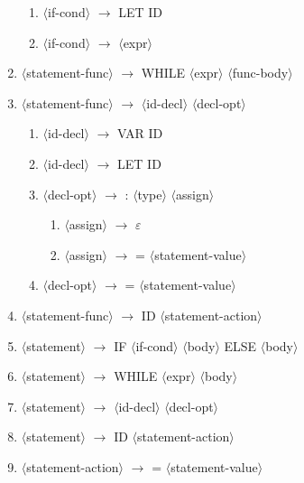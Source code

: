 \documentclass[11pt]{article}
\newcommand{\red}[1]{{\color{red} #1}}
\begin{document}
\begin{enumerate}[label=\arabic*., ref=\arabic*]
\begin{enumerate}[label=\arabic{enumi}.\arabic*., ref=\arabic{enumi}.\arabic*]
        \item $\langle$if-cond$\rangle$ $\rightarrow$ \red{LET ID}
        \item $\langle$if-cond$\rangle$ $\rightarrow$ $\langle$expr$\rangle$
    \end{enumerate}
    \item $\langle$statement-func$\rangle$ $\rightarrow$ \red{WHILE} $\langle$expr$\rangle$ $\langle$func-body$\rangle$
    \item $\langle$statement-func$\rangle$ $\rightarrow$ $\langle$id-decl$\rangle$ $\langle$decl-opt$\rangle$
    \begin{enumerate}[label=\arabic{enumi}.\arabic*., ref=\arabic{enumi}.\arabic*]
        \item $\langle$id-decl$\rangle$ $\rightarrow$ \red{VAR ID}
        \item $\langle$id-decl$\rangle$ $\rightarrow$ \red{LET ID}
        \item $\langle$decl-opt$\rangle$ $\rightarrow$ \red{:} $\langle$type$\rangle$ $\langle$assign$\rangle$
        \begin{enumerate}[label=\arabic{enumi}.\arabic{enumi}.\arabic*., ref=\arabic{enumi}.\arabic{enumi}.\arabic*]
            \item $\langle$assign$\rangle$ $\rightarrow$ \red{$\varepsilon$}
            \item $\langle$assign$\rangle$ $\rightarrow$ \red{=} $\langle$statement-value$\rangle$
        \end{enumerate}
        \item $\langle$decl-opt$\rangle$ $\rightarrow$ \red{=} $\langle$statement-value$\rangle$
    \end{enumerate}
    \item $\langle$statement-func$\rangle$ $\rightarrow$ \red{ID} $\langle$statement-action$\rangle$
    \item $\langle$statement$\rangle$ $\rightarrow$ \red{IF} $\langle$if-cond$\rangle$ $\langle$body$\rangle$ \red{ELSE} $\langle$body$\rangle$
    \item $\langle$statement$\rangle$ $\rightarrow$ \red{WHILE} $\langle$expr$\rangle$ $\langle$body$\rangle$
    \item $\langle$statement$\rangle$ $\rightarrow$ $\langle$id-decl$\rangle$ $\langle$decl-opt$\rangle$
    \item $\langle$statement$\rangle$ $\rightarrow$ \red{ID} $\langle$statement-action$\rangle$
    \item $\langle$statement-action$\rangle$ $\rightarrow$ \red{=} $\langle$statement-value$\rangle$

\end{enumerate}
\end{document}
